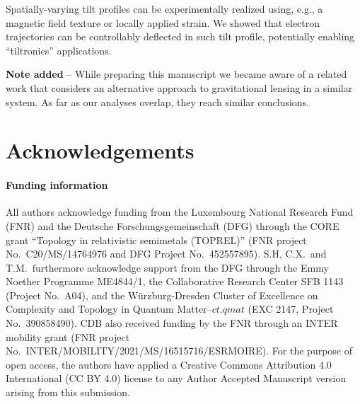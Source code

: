 \documentclass[submission, Phys]{SciPost}
\begin{document}
Spatially-varying tilt profiles can be experimentally realized using, e.g., a magnetic field texture or locally applied strain. We showed that electron trajectories can be controllably deflected in such tilt profile, potentially enabling ``tiltronics'' applications.

\textbf{Note added} -- While preparing this manuscript we became aware of a related work \cite{ifwdraft} that considers an alternative approach to gravitational lensing in a similar system. As far as our analyses overlap, they reach similar conclusions.

\section*{Acknowledgements}
\paragraph{Funding information}
All authors acknowledge funding from the Luxembourg National Research Fund (FNR) and the Deutsche Forschungsgemeinschaft (DFG) through the CORE grant ``Topology in relativistic semimetals (TOPREL)'' (FNR project No.\ C20/MS/14764976 and DFG Project No.\ 452557895).
S.H, C.X.~and T.M.~furthermore acknowledge support from the DFG through the Emmy Noether Programme ME4844/1, the Collaborative Research Center SFB 1143 (Project No.\ A04), and the W\"{u}rzburg-Dresden Cluster of Excellence on Complexity and Topology in Quantum Matter--$ct.qmat$ (EXC 2147, Project No.\ 390858490).
CDB also received funding by the FNR through an INTER mobility grant (FNR project No.\ INTER/MOBILITY/2021/MS/16515716/ESRMOIRE). For the purpose of open access, the authors have applied a Creative Commons Attribution 4.0 International (CC BY 4.0) license to any Author Accepted Manuscript version arising from this submission.
\end{document}
